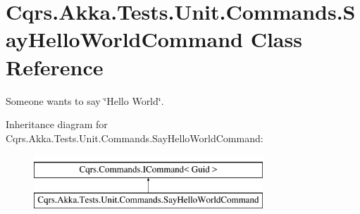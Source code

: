 \hypertarget{classCqrs_1_1Akka_1_1Tests_1_1Unit_1_1Commands_1_1SayHelloWorldCommand}{}\section{Cqrs.\+Akka.\+Tests.\+Unit.\+Commands.\+Say\+Hello\+World\+Command Class Reference}
\label{classCqrs_1_1Akka_1_1Tests_1_1Unit_1_1Commands_1_1SayHelloWorldCommand}


Someone wants to say \char`\"{}\+Hello World\char`\"{}.  


Inheritance diagram for Cqrs.\+Akka.\+Tests.\+Unit.\+Commands.\+Say\+Hello\+World\+Command\+:\begin{figure}[H]
\begin{center}
\leavevmode
\includegraphics[height=2.000000cm]{classCqrs_1_1Akka_1_1Tests_1_1Unit_1_1Commands_1_1SayHelloWorldCommand}
\end{center}
\end{figure}
